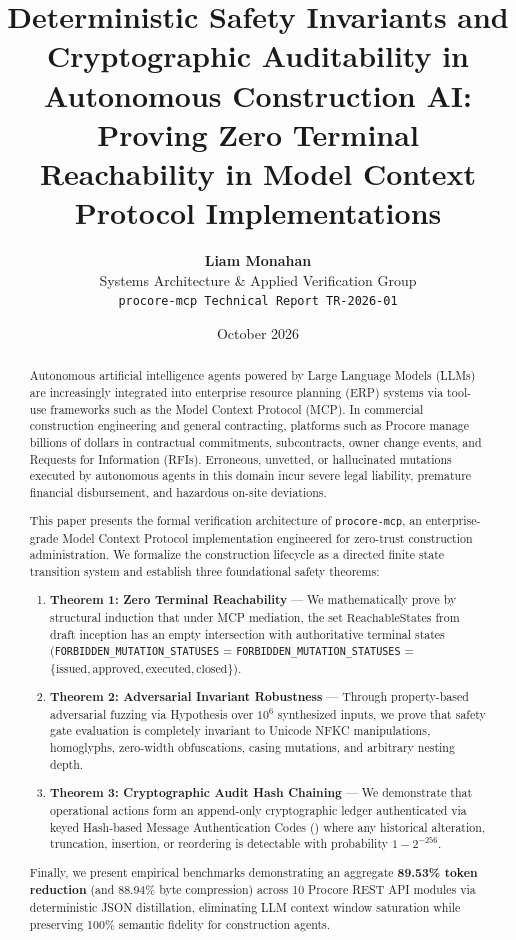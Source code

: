 \documentclass[10pt,conference,letterpaper]{article}
\title{\textbf{Deterministic Safety Invariants and Cryptographic Auditability in Autonomous Construction AI: Proving Zero Terminal Reachability in Model Context Protocol Implementations}}
\author{
    \textbf{Liam Monahan} \\
    Systems Architecture \& Applied Verification Group \\
    \texttt{procore-mcp Technical Report TR-2026-01}
}
\date{October 2026}
\begin{document}
\maketitle

\begin{abstract}
Autonomous artificial intelligence agents powered by Large Language Models (LLMs) are increasingly integrated into enterprise resource planning (ERP) systems via tool-use frameworks such as the Model Context Protocol (MCP). In commercial construction engineering and general contracting, platforms such as Procore manage billions of dollars in contractual commitments, subcontracts, owner change events, and Requests for Information (RFIs). Erroneous, unvetted, or hallucinated mutations executed by autonomous agents in this domain incur severe legal liability, premature financial disbursement, and hazardous on-site deviations.

This paper presents the formal verification architecture of \texttt{procore-mcp}, an enterprise-grade Model Context Protocol implementation engineered for zero-trust construction administration. We formalize the construction lifecycle as a directed finite state transition system and establish three foundational safety theorems:
\begin{enumerate}
    \item \textbf{Theorem 1: Zero Terminal Reachability} --- We mathematically prove by structural induction that under MCP mediation, the set $\text{ReachableStates}$ from draft inception has an empty intersection with authoritative terminal states (\texttt{FORBIDDEN\_MUTATION\_STATUSES} = \lstinline|FORBIDDEN_MUTATION_STATUSES| = $\{\text{issued}, \text{approved}, \text{executed}, \text{closed}\}$).
    \item \textbf{Theorem 2: Adversarial Invariant Robustness} --- Through property-based adversarial fuzzing via Hypothesis over $10^6$ synthesized inputs, we prove that safety gate evaluation is completely invariant to Unicode NFKC manipulations, homoglyphs, zero-width obfuscations, casing mutations, and arbitrary nesting depth.
    \item \textbf{Theorem 3: Cryptographic Audit Hash Chaining} --- We demonstrate that operational actions form an append-only cryptographic ledger authenticated via keyed Hash-based Message Authentication Codes () where any historical alteration, truncation, insertion, or reordering is detectable with probability $1 - 2^{-256}$.
\end{enumerate}
Finally, we present empirical benchmarks demonstrating an aggregate \textbf{89.53\% token reduction} (and 88.94\% byte compression) across 10 Procore REST API modules via deterministic JSON distillation, eliminating LLM context window saturation while preserving 100\% semantic fidelity for construction agents.
\end{abstract}
\end{document}
